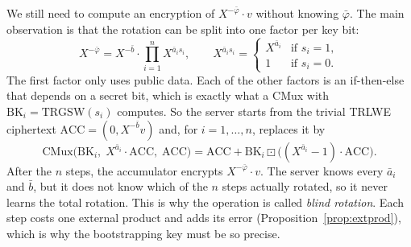 \documentclass[12pt]{article}
\theoremstyle{plain}
\theoremstyle{definition}
\newcommand{\BK}{\mathrm{BK}}
\newcommand{\ext}{\boxdot}
\begin{document}
We still need to compute an encryption of $X^{-\bar\varphi}\cdot v$ without
knowing $\bar\varphi$. The main observation is that the rotation can be split
into one factor per key bit:
\[
  X^{-\bar\varphi}=X^{-\bar b}\cdot\prod_{i=1}^{n}X^{\bar a_is_i},
  \qquad
  X^{\bar a_is_i}=\begin{cases}X^{\bar a_i}&\text{if }s_i=1,\\1&\text{if }s_i=0.\end{cases}
\]
The first factor only uses public data. Each of the other factors is an
if-then-else that depends on a secret bit, which is exactly what a CMux with
$\BK_i=\mathrm{TRGSW}(s_i)$ computes. So the server starts from the trivial
TRLWE ciphertext $\mathrm{ACC}=(0,X^{-\bar b}v)$ and, for $i=1,\dots,n$, replaces
it by
\[
  \mathrm{CMux}\big(\BK_i,\;X^{\bar a_i}\cdot\mathrm{ACC},\;\mathrm{ACC}\big)
  =\mathrm{ACC}+\BK_i\ext\big((X^{\bar a_i}-1)\cdot\mathrm{ACC}\big).
\]
After the $n$ steps, the accumulator encrypts $X^{-\bar\varphi}\cdot v$. The
server knows every $\bar a_i$ and $\bar b$, but it does not know which of the
$n$ steps actually rotated, so it never learns the total rotation. This is why
the operation is called \emph{blind rotation}. Each step costs one external
product and adds its error (Proposition~\ref{prop:extprod}), which is why the
bootstrapping key must be so precise.
\end{document}

